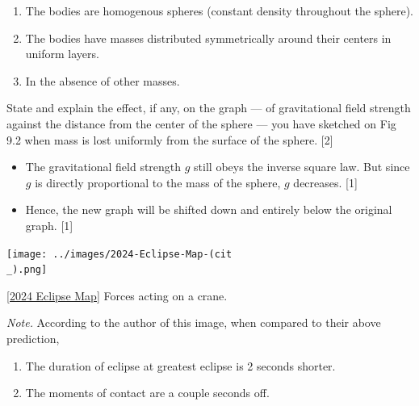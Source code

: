 \begin{itemize}[label=\(\square\)]
\begin{enumerate}
    \item The bodies are homogenous spheres (constant density throughout the sphere).
    \item The bodies have masses distributed symmetrically around their centers in uniform layers.
    \item In the absence of other masses.
\end{enumerate}
\begin{example}{}{}
    State and explain the effect, if any, on the graph --- of gravitational field strength against the distance from the center of the sphere --- you have sketched on Fig 9.2 when mass is lost uniformly from the surface of the sphere. \hspace*{\fill} [2]
    \begin{itemize}
        \item The gravitational field strength \(g\) still obeys the inverse square law. But since \(g\) is directly proportional to the mass of the sphere, \(g\) decreases. \hspace*{\fill} [1]
        \item Hence, the new graph will be shifted down and entirely below the original graph. \hspace*{\fill} [1]
    \end{itemize}
\end{example}
\end{itemize}
\begin{center}
    \texttt{[image: ../images/2024-Eclipse-Map-(cit\\\_).png]}
    \captionsetup{type=figure}
    \caption[figure]{\ref{2024 Eclipse Map} Forces acting on a crane.}
\end{center}
\emph{Note.} According to the author of this image, when compared to their above prediction,
\begin{enumerate}
    \item The duration of eclipse at greatest eclipse is 2 seconds shorter.
    \item The moments of contact are a couple seconds off.
\end{enumerate}
